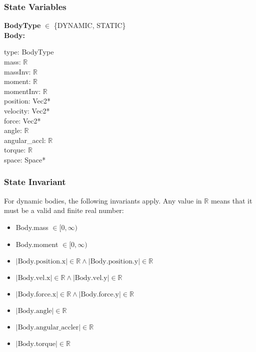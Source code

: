 \documentclass[12pt]{article}
\newcommand{\R}{$\mathbb{R}$}
\begin{document}
\subsubsection{State Variables} \label{SecSVBody}
	\textbf{BodyType} $\in$ \{DYNAMIC, STATIC\} \\ 
	\newline
	\textbf{Body:} 
	 \begin{multicols}{3}
		\noindent type: BodyType \\
		mass: \R \\
		massInv: \R \\
		moment: \R \\
		momentInv: \R \\
		position: Vec2* \\
		velocity: Vec2* \\
		force: Vec2* \\
		angle: \R \\
		angular_accl: \R \\
		torque: \R \\
		space: Space* \\
	\end{multicols}
	
\subsubsection{State Invariant} \label{SecSIBody}
	For dynamic bodies, the following invariants apply. Any value in $\mathbb{R}$ means that it must be a valid and finite real number: 
	\begin{itemize}
	\item Body.mass $\in [0, \infty)$ 
	\item Body.moment $\in [0, \infty)$ 
	\item $|\text{Body.position.x}| \in \mathbb{R} \wedge |\text{Body.position.y}| \in \mathbb{R}$ 
	\item $|\text{Body.vel.x}| \in \mathbb{R} \wedge |\text{Body.vel.y}| \in \mathbb{R}$ 	
	\item $|\text{Body.force.x}| \in \mathbb{R} \wedge |\text{Body.force.y}| \in \mathbb{R}$ 
	\item $|\text{Body.angle}| \in \mathbb{R}$  
	\item $|\text{Body.angular_accler}| \in \mathbb{R}$  
	\item $|\text{Body.torque}| \in \mathbb{R}$
	\end{itemize}
\end{document}
